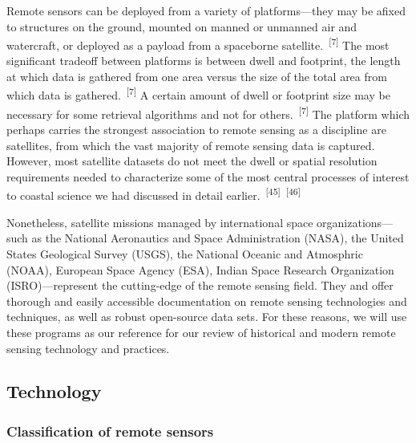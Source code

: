 \documentclass{article}
\begin{document}

\par{Remote sensors can be deployed from a variety of platforms---they may be afixed to structures on the ground, mounted on manned or unmanned air and watercraft, or deployed as a payload from a spaceborne satellite.~\textsuperscript{[7]} The most significant tradeoff between platforms is between dwell and footprint, the length at which data is gathered from one area versus the size of the total area from which data is gathered.~\textsuperscript{[7]} A certain amount of dwell or footprint size may be necessary for some retrieval algorithms and not for others.~\textsuperscript{[7]} The platform which perhaps carries the strongest association to remote sensing as a discipline are satellites, from which the vast majority of remote sensing data is captured. However, most satellite datasets do not meet the dwell or spatial resolution requirements needed to characterize some of the most central processes of interest to coastal science we had discussed in detail earlier.~\textsuperscript{[45]}~\textsuperscript{[46]}}


\par{Nonetheless, satellite missions managed by international space organizations---such as the National Aeronautics and Space Administration (NASA), the United States Geological Survey (USGS), the National Oceanic and Atmosphric (NOAA), European Space Agency (ESA), Indian Space Research Organization (ISRO)---represent the cutting-edge of the remote sensing field. They and offer thorough and easily accessible documentation on remote sensing technologies and techniques, as well as robust open-source data sets. For these reasons, we will use these programs as our reference for our review of historical and modern remote sensing technology and practices.}



\subsection{Technology}

\subsubsection{Classification of remote sensors}

\end{document}

